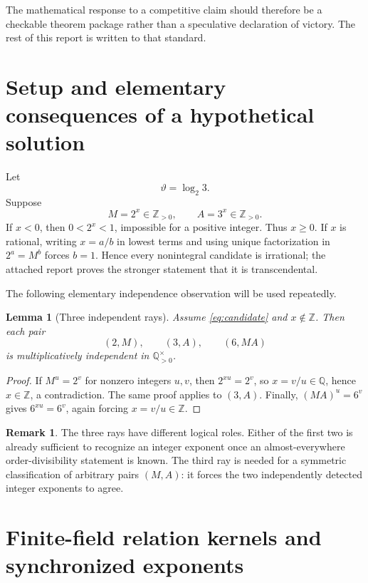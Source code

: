 \documentclass[11pt]{article}
\newtheorem{lemma}[theorem]{Lemma}
\theoremstyle{definition}
\newtheorem{remark}[theorem]{Remark}
\newcommand{\Z}{\mathbb Z}
\newcommand{\Q}{\mathbb Q}
\newcommand{\thetaq}{\vartheta}
\begin{document}
The mathematical response to a competitive claim should therefore be a checkable theorem
package rather than a speculative declaration of victory.  The rest of this report is written
to that standard.

\section{Setup and elementary consequences of a hypothetical solution}
\label{sec:setup}

Let
\[
 \thetaq=\log_2 3.
\]
Suppose
\begin{equation}
  M=2^x\in\Z_{>0},
  \qquad
  A=3^x\in\Z_{>0}.
  \label{eq:candidate}
\end{equation}
If $x<0$, then $0<2^x<1$, impossible for a positive integer.  Thus $x\ge0$.  If $x$ is
rational, writing $x=a/b$ in lowest terms and using unique factorization in
$2^a=M^b$ forces $b=1$.  Hence every nonintegral candidate is irrational; the attached report
proves the stronger statement that it is transcendental.

The following elementary independence observation will be used repeatedly.

\begin{lemma}[Three independent rays]
\label{lem:three-rays}
Assume \eqref{eq:candidate} and $x\notin\Z$.  Then each pair
\[
 (2,M),\qquad(3,A),\qquad(6,MA)
\]
is multiplicatively independent in $\Q_{>0}^{\times}$.
\end{lemma}

\begin{proof}
If $M^u=2^v$ for nonzero integers $u,v$, then
$2^{xu}=2^v$, so $x=v/u\in\Q$, hence $x\in\Z$, a contradiction.  The same proof applies to
$(3,A)$.  Finally, $(MA)^u=6^v$ gives $6^{xu}=6^v$, again forcing $x=v/u\in\Z$.
\end{proof}

\begin{remark}
The three rays have different logical roles.  Either of the first two is already sufficient
to recognize an integer exponent once an almost-everywhere order-divisibility statement is
known.  The third ray is needed for a symmetric classification of arbitrary pairs $(M,A)$:
it forces the two independently detected integer exponents to agree.
\end{remark}

\section{Finite-field relation kernels and synchronized exponents}
\label{sec:relkernels}
\end{document}
